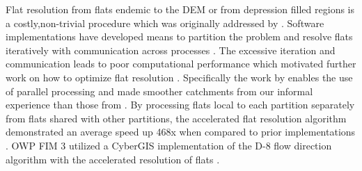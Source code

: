 Flat resolution from flats endemic to the DEM or from depression filled regions is a costly,non-trivial procedure which was originally addressed by .  
Software implementations have developed means to partition the problem and resolve flats iteratively with communication across processes \cite{tarboton2009generalized,tesfa2011extraction,wallis2009parallel,tarboton2005terrain}.
The excessive iteration and communication leads to poor computational performance which motivated further work on how to optimize flat resolution \cite{survila2016scalable,barnes2014efficient}.
Specifically the work by  enables the use of parallel processing and made smoother catchments from our informal experience than those from .
By processing flats local to each partition separately from flats shared with other partitions, the accelerated flat resolution algorithm demonstrated an average speed up 468x when compared to prior implementations \cite{survila2016scalable}.
OWP FIM 3 utilized a CyberGIS implementation of the D-8 flow direction algorithm with the accelerated resolution of flats \cite{survila2016scalable,cybergis2016}.
%

